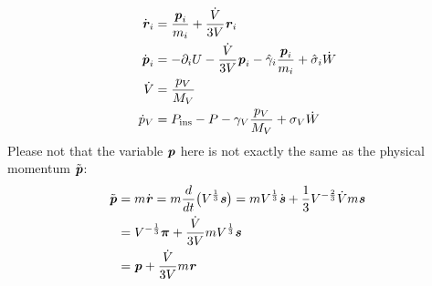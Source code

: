 \documentclass[aps, pre, preprint,unsortedaddress,a4paper,onecolumn]{revtex4}
\newcommand{\vect}[1]{\textbf{\textit{#1}}}
\newcommand{\mypi}{\boldsymbol\pi}
\newcommand{\ins}{\textrm{ins}}
\begin{document}
\begin{align}
  \dot{\vect r}_i
  &= \frac{\vect p_i}{m_i} + \frac{\dot V}{3V} \vect r_i\\
  \dot{\vect p}_i
  & =
  -\partial_i U - \frac{\dot V}{3V}\vect p_i - \hat\gamma_i\frac{\vect p_i}{m_i}
  + \hat\sigma_i\dot W\\
  \dot{V} 
  &=
  \frac{p_V}{M_V} \\
  \dot{p}_V
  &=
  P_\ins - P - \gamma_V  \frac{p_V}{M_V} + \sigma_V\dot W   
\end{align}
Please not that the variable $\vect p$ here is not exactly the same as the physical momentum $\tilde {\vect p}$:
\begin{align}\nonumber
  \tilde {\vect p}
  &= m \dot{\vect r}
  = m \frac{d}{dt}\big(V^{\frac13}\vect s\big)
  = m V^{\frac13}\dot{\vect s} + \frac13 V^{-\frac23}\dot Vm\vect s \\\nonumber
  & =
  V^{-\frac13}\mypi + \frac{\dot V}{3V}m V^{\frac13}\vect s \\
  &=
  \vect p + \frac{\dot V}{3V}m\vect r
\end{align}





% 
\end{document}
